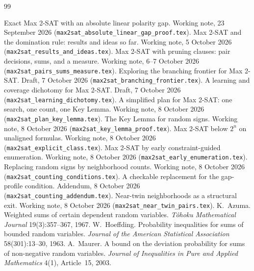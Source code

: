 \documentclass[11pt,a4paper]{article}
\theoremstyle{definition}
\theoremstyle{remark}
\begin{document}
\begin{thebibliography}{99}
\raggedright
{} Exact Max 2-SAT with an absolute linear polarity gap. Working
 note, 23 September 2026 (\texttt{max2sat\_absolute\_linear\_gap\_proof.tex}).
 Max 2-SAT and the domination rule: results and ideas so far.
 Working note, 5 October 2026 (\texttt{max2sat\_results\_and\_ideas.tex}).
 Max 2-SAT with pruning clauses: pair decisions, sums, and a
 measure. Working note, 6--7 October 2026
 (\texttt{max2sat\_pairs\_sums\_measure.tex}).
 Exploring the branching frontier for Max 2-SAT. Draft,
 7 October 2026 (\texttt{max2sat\_branching\_frontier.tex}).
 A learning and coverage dichotomy for Max 2-SAT. Draft,
 7 October 2026 (\texttt{max2sat\_learning\_dichotomy.tex}).
 A simplified plan for Max 2-SAT: one search, one count, one Key
 Lemma. Working note, 8 October 2026 (\texttt{max2sat\_plan\_key\_lemma.tex}).
 The Key Lemma for random signs. Working note, 8 October 2026
 (\texttt{max2sat\_key\_lemma\_proof.tex}).
 Max 2-SAT below $2^n$ on unaligned formulas. Working note,
 8 October 2026 (\texttt{max2sat\_explicit\_class.tex}).
 Max 2-SAT by early constraint-guided enumeration. Working note,
 8 October 2026 (\texttt{max2sat\_early\_enumeration.tex}).
 Replacing random signs by neighborhood counts. Working note,
 8 October 2026 (\texttt{max2sat\_counting\_conditions.tex}).
 A checkable replacement for the gap-profile condition. Addendum,
 8 October 2026 (\texttt{max2sat\_counting\_addendum.tex}).
 Near-twin neighborhoods as a structural exit. Working note,
 8 October 2026 (\texttt{max2sat\_near\_twin\_pairs.tex}).
 K.~Azuma. Weighted sums of certain dependent random variables.
 \emph{T\^ohoku Mathematical Journal} 19(3):357--367, 1967.
 W.~Hoeffding. Probability inequalities for sums of bounded
 random variables. \emph{Journal of the American Statistical Association}
 58(301):13--30, 1963.
 A.~Maurer. A bound on the deviation probability for sums of
 non-negative random variables. \emph{Journal of Inequalities in Pure and
 Applied Mathematics} 4(1), Article~15, 2003.
\end{thebibliography}
\end{document}
